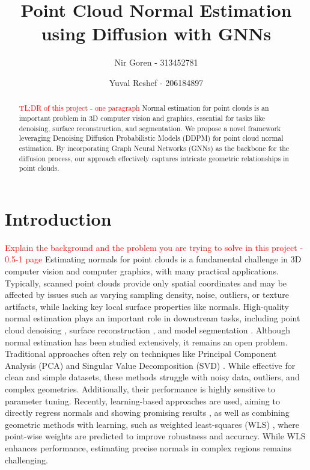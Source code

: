 \documentclass{acmart}
\title{Point Cloud Normal Estimation using Diffusion with GNNs}
\author{Nir Goren - 313452781}
\author{Yuval Reshef - 206184897}
\date{}
\newcommand{\instructions}[1]{\textcolor{red}{#1}\newline}
\begin{document}
\begin{abstract}
\instructions{TL;DR of this project -  one paragraph}
Normal estimation for point clouds is an important problem in 3D computer vision and graphics, essential for tasks like denoising, surface reconstruction, and segmentation. We propose a novel framework leveraging Denoising Diffusion Probabilistic Models (DDPM) for point cloud normal estimation. By incorporating Graph Neural Networks (GNNs) as the backbone for the diffusion process, our approach effectively captures intricate geometric relationships in point clouds.
\end{abstract}
\maketitle

\section{Introduction}
\instructions{Explain the background and the problem you are trying to solve in this project - 0.5-1 page}
Estimating normals for point clouds is a fundamental challenge in 3D computer vision and computer graphics, with many practical applications. Typically, scanned point clouds provide only spatial coordinates and may be affected by issues such as varying sampling density, noise, outliers, or texture artifacts, while lacking key local surface properties like normals. High-quality normal estimation plays an important role in downstream tasks, including point cloud denoising \cite{lu2020deep,lu2020low}, surface reconstruction \cite{kazhdan2006poisson,fleishman2005robust}, and model segmentation \cite{che2018multi}.
Although normal estimation has been studied extensively, it remains an open problem. Traditional approaches often rely on techniques like Principal Component Analysis (PCA) \cite{hoppe1992surface} and Singular Value Decomposition (SVD) \cite{pauly2002efficient}. While effective for clean and simple datasets, these methods struggle with noisy data, outliers, and complex geometries. Additionally, their performance is highly sensitive to parameter tuning.
Recently, learning-based approaches are used, aiming to directly regress normals and showing promising results \cite{guerrero2018pcpnet,ben2019nesti,zhou2020geometry,wang2020neighbourhood,hashimoto2019normal}, as well as combining geometric methods with learning, such as weighted least-squares (WLS) \cite{lenssen2020deep,ben2020deepfit,zhang2022geometry,zhu2021adafit}, where point-wise weights are predicted to improve robustness and accuracy. While WLS enhances performance, estimating precise normals in complex regions remains challenging.
\end{document}
